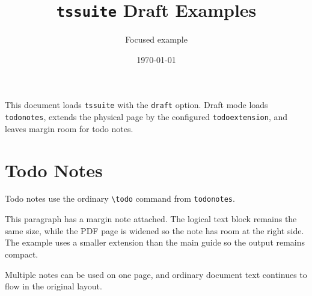 \documentclass[a4paper,11pt]{article}
\title{\texttt{tssuite} Draft Examples}
\author{Focused example}
\date{\today}
\begin{document}
\maketitle

This document loads \texttt{tssuite} with the \texttt{draft} option. Draft mode
loads \texttt{todonotes}, extends the physical page by the configured
\texttt{todoextension}, and leaves margin room for todo notes.

\section{Todo Notes}

Todo notes use the ordinary \verb|\todo| command from \texttt{todonotes}.


This paragraph has a margin note attached. The logical text block remains the
same size, while the PDF page is widened so the note has room at the right side.
The example uses a smaller extension than the main guide so the output remains
compact.


Multiple notes can be used on one page, and ordinary document text continues to
flow in the original layout.
\end{document}
